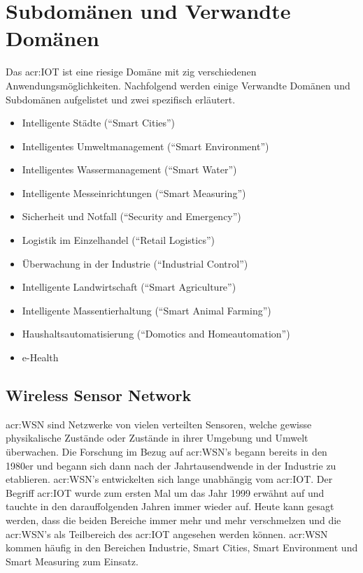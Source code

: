 \section{Subdomänen und Verwandte Domänen}
Das \gls{acr:IOT} ist eine riesige Domäne mit zig verschiedenen Anwendungsmöglichkeiten. Nachfolgend werden einige Verwandte Domänen und Subdomänen aufgelistet und zwei spezifisch erläutert.

\begin{itemize}
\item Intelligente Städte ("`Smart Cities"')
\item Intelligentes Umweltmanagement ("`Smart Environment"')
\item Intelligentes Wassermanagement ("`Smart Water"')
\item Intelligente Messeinrichtungen ("`Smart Measuring"')
\item Sicherheit und Notfall ("`Security and Emergency"')
\item Logistik im Einzelhandel ("`Retail Logistics"')
\item Überwachung in der Industrie ("`Industrial Control"')
\item Intelligente Landwirtschaft ("`Smart Agriculture"')
\item Intelligente Massentierhaltung ("`Smart Animal Farming"')
\item Haushaltsautomatisierung ("`Domotics and Homeautomation"')
\item e-Health
\end{itemize}


\subsection{Wireless Sensor Network}	

\gls{acr:WSN} sind Netzwerke von vielen verteilten Sensoren, welche gewisse physikalische Zustände oder Zustände in ihrer Umgebung und Umwelt überwachen. Die Forschung im Bezug auf \gls{acr:WSN}'s begann bereits in den 1980er und begann sich dann nach der Jahrtausendwende in der Industrie zu etablieren. \gls{acr:WSN}'s entwickelten sich lange unabhängig vom \gls{acr:IOT}. Der Begriff \gls{acr:IOT} wurde zum ersten Mal um das Jahr 1999 erwähnt auf und tauchte in den darauffolgenden Jahren immer wieder auf. Heute kann gesagt werden, dass die beiden Bereiche immer mehr und mehr verschmelzen und die \gls{acr:WSN}'s als Teilbereich des \gls{acr:IOT} angesehen werden können. \gls{acr:WSN} kommen häufig in den Bereichen Industrie, Smart Cities, Smart Environment und Smart Measuring zum Einsatz.


